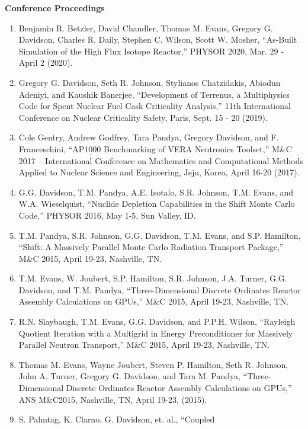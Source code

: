 \documentclass[letterpaper,11pt]{article}
\newcommand{\leftsubheading}[1]{
  \textbf{#1\vspace{-6pt} \\}}
\begin{document}

\leftsubheading{Conference Proceedings}
\begin{enumerate}
  \item Benjamin R. Betzler, David Chandler, Thomas M. Evans, Gregory
    G. Davidson, Charles R. Daily, Stephen C. Wilson, Scott W. Mosher,
    ``As-Built Simulation of the High Flux Isotope Reactor,'' PHYSOR
    2020, Mar. 29 - April 2 (2020).
  \item Gregory G. Davidson, Seth R. Johnson, Stylianos Chatzidakis,
    Abiodun Adeniyi, and Kaushik Banerjee, ``Development of Terrenus,
    a Multiphysics Code for Spent Nuclear Fuel Cask Criticality
    Analysis,'' 11th International Conference on Nuclear Criticality
    Safety, Paris, Sept. 15 - 20 (2019).
  \item Cole Gentry, Andrew Godfrey, Tara Pandya, Gregory Davidson, and
    F. Franceschini, ``AP1000 Benchmarking of VERA Neutronics
    Toolset,'' M\&C 2017 – International Conference on Mathematics and
    Computational Methods Applied to Nuclear Science and Engineering,
    Jeju, Korea, April 16-20 (2017).
  \item G.G. Davidson, T.M. Pandya, A.E. Isotalo, S.R. Johnson,
    T.M. Evans, and W.A. Wieselquist, ``Nuclide Depletion Capabilities
    in the Shift Monte Carlo Code,'' PHYSOR 2016, May 1-5, Sun Valley,
    ID.
  \item T.M. Pandya, S.R. Johnson, G.G. Davidson, T.M. Evans, and
    S.P. Hamilton, ``Shift: A Massively Parallel Monte Carlo Radiation
    Transport Package,'' M\&C 2015, April 19-23, Nashville, TN.
  \item T.M. Evans, W. Joubert, S.P. Hamilton, S.R. Johnson,
    J.A. Turner, G.G. Davidson, and T.M. Pandya, ``Three-Dimensional
    Discrete Ordinates Reactor Assembly Calculations on GPUs,'' M\&C
    2015, April 19-23, Nashville, TN.
  \item R.N. Slaybaugh, T.M. Evans, G.G. Davidson, and P.P.H. Wilson,
    ``Rayleigh Quotient Iteration with a Multigrid in Energy
    Preconditioner for Massively Parallel Neutron Transport,'' M\&C
    2015, April 19-23, Nashville, TN.
  \item Thomas M. Evans, Wayne Joubert, Steven P. Hamilton, Seth
    R. Johnson, John A. Turner, Gregory G. Davidson, and Tara
    M. Pandya, ``Three-Dimensional Discrete Ordinates Reactor
    Assembly Calculations on GPUs,'' ANS M\&C2015, Nashville, TN,
    April 19-23, (2015).
  \item S. Palmtag, K. Clarno, G. Davidson, et. al., ``Coupled

\end{enumerate}
\end{document}
